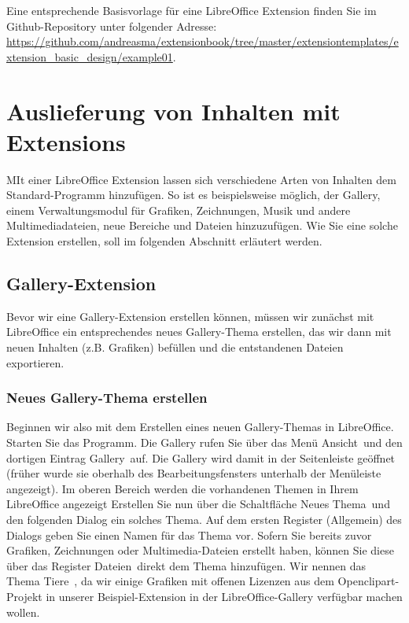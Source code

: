 \documentclass[a4paper,10pt,pagesize,titlepage]{scrbook}
\begin{document}
Eine entsprechende Basisvorlage für eine LibreOffice Extension finden Sie im Github-Repository unter folgender Adresse:
\url{https://github.com/andreasma/extensionbook/tree/master/extensiontemplates/extension_basic_design/example01}.

\chapter{Auslieferung von Inhalten mit Extensions}

MIt einer LibreOffice Extension lassen sich verschiedene Arten von Inhalten dem Standard-Programm hinzufügen. So ist es beispielsweise möglich, der Gallery, einem Verwaltungsmodul für Grafiken, Zeichnungen, Musik und andere Multimediadateien, neue Bereiche und Dateien hinzuzufügen. Wie Sie eine solche Extension erstellen, soll im folgenden Abschnitt erläutert werden.

\section{Gallery-Extension}

Bevor wir eine Gallery-Extension erstellen können, müssen wir zunächst mit LibreOffice ein entsprechendes neues Gallery-Thema erstellen, das wir dann mit neuen Inhalten (z.B. Grafiken) befüllen und die entstandenen Dateien exportieren.

\subsection{Neues Gallery-Thema erstellen}

Beginnen wir also mit dem Erstellen eines neuen Gallery-Themas in LibreOffice. Starten Sie das Programm. Die Gallery rufen Sie über das Menü \glqq Ansicht\grqq~und den dortigen Eintrag \glqq Gallery\grqq~auf. Die Gallery wird damit in der Seitenleiste geöffnet (früher wurde sie oberhalb des Bearbeitungsfensters unterhalb der Menüleiste angezeigt). Im oberen Bereich werden die vorhandenen Themen in Ihrem LibreOffice angezeigt Erstellen Sie nun über die Schaltfläche \glqq Neues Thema\grqq~und den folgenden Dialog ein solches Thema. Auf dem ersten Register (\glqq Allgemein\grqq) des Dialogs geben Sie einen Namen für das Thema vor. Sofern Sie bereits zuvor Grafiken, Zeichnungen oder Multimedia-Dateien erstellt haben, können Sie diese über das Register \glqq Dateien\grqq~direkt dem Thema hinzufügen. Wir nennen das Thema \glqq Tiere\grqq~, da wir einige Grafiken mit offenen Lizenzen aus dem Openclipart-Projekt in unserer Beispiel-Extension in der LibreOffice-Gallery verfügbar machen wollen.
\end{document}
